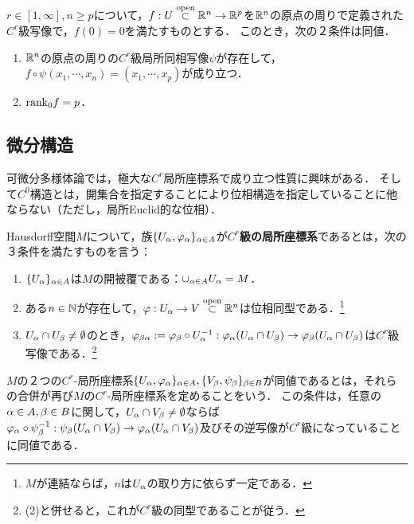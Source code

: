 \documentclass[uplatex,dvipdfmx]{jsreport}
\begin{document}
\begin{corollary}[低次元への写像の場合]\label{cor-implicit-function-2}
    $r\in[1,\infty],n\ge p$について，$f:U\overset{\mathrm{open}}{\subset}\mathbb{R}^n\to\mathbb{R}^p$を$\mathbb{R}^n$の原点の周りで定義された$C^r$級写像で，$f(0)=0$を満たすものとする．
    このとき，次の２条件は同値．
    \begin{enumerate}
        \item $\mathbb{R}^n$の原点の周りの$C^r$級局所同相写像$\psi$が存在して，$f\circ\psi(x_1,\cdots,x_n)=(x_1,\cdots,x_p)$が成り立つ．
        \item $\mathrm{rank}_0f=p$．
    \end{enumerate}
\end{corollary}

\subsection{微分構造}

\begin{tcolorbox}[colframe=ForestGreen, colback=ForestGreen!10!white,breakable,colbacktitle=ForestGreen!40!white,coltitle=black,fonttitle=\bfseries\sffamily,
title=]
    可微分多様体論では，極大な$C^r$局所座標系で成り立つ性質に興味がある．
    そして$C^0$構造とは，開集合を指定することにより位相構造を指定していることに他ならない（ただし，局所Euclid的な位相）．
\end{tcolorbox}

\begin{definition}
    Hausdorff空間$M$について，族$\{U_\alpha,\varphi_\alpha\}_{\alpha\in A}$が\textbf{$C^r$級の局所座標系}であるとは，次の３条件を満たすものを言う：
    \begin{enumerate}
        \item $\{U_\alpha\}_{\alpha\in A}$は$M$の開被覆である：$\cup_{\alpha\in A}U_\alpha=M$．
        \item ある$n\in\mathbb{N}$が存在して，$\varphi:U_\alpha\to V\overset{\mathrm{open}}{\subset}\mathbb{R}^n$は位相同型である．\footnote{$M$が連結ならば，$n$は$U_\alpha$の取り方に依らず一定である．}
        \item $U_\alpha\cap U_\beta\ne\emptyset$のとき，$\varphi_{\beta\alpha}:=\varphi_\beta\circ U_\alpha^{-1}:\varphi_\alpha(U_\alpha\cap U_\beta)\to\varphi_\beta(U_\alpha\cap U_\beta)$は$C^r$級写像である．\footnote{(2)と併せると，これが$C^r$級の同型であることが従う．}
    \end{enumerate}
\end{definition}

\begin{definition}[同値なアトラス]
    $M$の２つの$C^r$-局所座標系$\{U_\alpha,\varphi_\alpha\}_{\alpha\in A},\{V_\beta,\psi_\beta\}_{\beta\in B}$が同値であるとは，それらの合併が再び$M$の$C^r$-局所座標系を定めることをいう．
    この条件は，任意の$\alpha\in A,\beta\in B$に関して，$U_\alpha\cap V_\beta\ne\emptyset$ならば$\varphi_\alpha\circ\psi_\beta^{-1}:\psi_\beta(U_\alpha\cap V_\beta)\to\varphi_\alpha(U_\alpha\cap V_\beta)$及びその逆写像が$C^r$級になっていることに同値である．
\end{definition}
\end{document}
